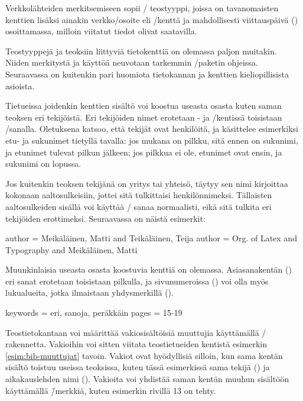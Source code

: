 Verkkolähteiden merkitsemiseen sopii \-/ teostyyppi,
joissa on tavanomaisten kenttien lisäksi ainakin verkko\-/osoite eli
\-/kenttä ja mahdollisesti viittauspäivä ()
osoittamassa, milloin viitatut tiedot olivat saatavilla.

Teostyyppejä ja teoksiin liittyviä tietokenttiä on olemassa paljon
muitakin. Niiden merkitystä ja käyttöä neuvotaan tarkemmin
\-/paketin ohjeissa. Seuraavassa on kuitenkin pari
huomiota tietokannan ja kenttien kieliopillisista asioista.

Tietueissa joidenkin kenttien sisältö voi koostua useasta osasta kuten
saman teoksen eri tekijöistä. Eri tekijöiden nimet erotetaan
- ja \-/kentissä toisistaan
\-/sanalla. Oletuksena  katsoo, että
tekijät ovat henkilöitä, ja käsittelee esimerkiksi etu- ja sukunimet
tietyllä tavalla: jos mukana on pilkku, sitä ennen on sukunimi, ja
etunimet tulevat pilkun jälkeen; jos pilkkua ei ole, etunimet ovat
ensin, ja sukunimi on lopussa.

Jos kuitenkin teoksen tekijänä on yritys tai yhteisö, täytyy sen nimi
kirjoittaa kokonaan aaltosulkeisiin, jottei sitä tulkittaisi
henkilönnimeksi. Tällaisten aaltosulkeiden sisällä voi käyttää
\-/ sanaa normaalisti, eikä sitä tulkita eri tekijöiden
erottimeksi. Seuraavassa on näistä esimerkit:

\begin{koodilohkosis}
  author = {Meikäläinen, Matti and Teikäläinen, Teija}
  author = {{Org. of Latex and Typography} and Meikäläinen, Matti}
\end{koodilohkosis}

Muunkinlaisia useasta osasta koostuvia kenttiä on olemassa.
Asiasanakentän () eri sanat erotetaan toisistaan
pilkulla, ja sivunumeroissa () voi olla myös lukualueita,
jotka ilmaistaan yhdysmerkillä \mbox{(\koodi{-})}.

\begin{koodilohkosis}
  keywords = {eri, sanoja, peräkkäin}
  pages = {15-19}
\end{koodilohkosis}

Teostietokantaan voi määrittää vakiosisältöisiä muuttujia käyttämällä
\-/ rakennetta. Vakioihin voi sitten viitata
teostietueiden kentistä esimerkin \ref{esim:bib-muuttujat} tavoin.
Vakiot ovat hyödyllisiä silloin, kun sama kentän sisältö toistuu useissa
teoksissa, kuten tässä esimerkissä sama tekijä () ja
aikakauslehden nimi (). Vakioita voi yhdistää
saman kentän muuhun sisältöön käyttämällä \koodi{\#}\=/merkkiä, kuten
esimerkin rivillä 13 on tehty.

